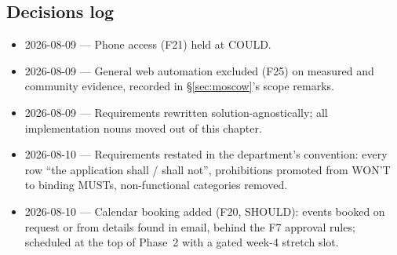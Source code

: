\documentclass[12pt]{article}
\begin{document}
\subsection{Decisions log}\label{sec:decisions-log}

\begin{itemize}[itemsep=2pt]
  \item 2026-08-09 --- Phone access (F21) held at COULD.
  \item 2026-08-09 --- General web automation excluded (F25) on measured and
    community evidence, recorded in \S\ref{sec:moscow}'s scope remarks.
  \item 2026-08-09 --- Requirements rewritten solution-agnostically; all
    implementation nouns moved out of this chapter.
  \item 2026-08-10 --- Requirements restated in the department's convention:
    every row ``the application shall / shall not'', prohibitions promoted
    from WON'T to binding MUSTs, non-functional categories removed.
  \item 2026-08-10 --- Calendar booking added (F20, SHOULD): events booked on
    request or from details found in email, behind the F7 approval rules;
    scheduled at the top of Phase~2 with a gated week-4 stretch slot.
\end{itemize}
\end{document}

